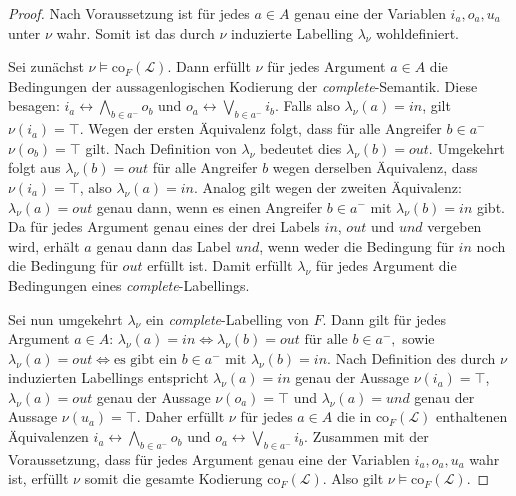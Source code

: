 \begin{proof}
    \label{pr:co-pl-correct}
    Nach Voraussetzung ist für jedes
    \(a\in A\) genau eine der Variablen \(i_a,o_a,u_a\) unter \(\nu\) wahr.
    Somit ist das durch \(\nu\) induzierte Labelling \(\lambda_\nu\)
    wohldefiniert.

    Sei zunächst \(\nu\models \mathrm{co}_F(\mathcal L)\). Dann erfüllt \(\nu\)
    für jedes Argument \(a\in A\) die Bedingungen der aussagenlogischen
    Kodierung der \textit{complete}-Semantik. Diese besagen:
    \(i_a \leftrightarrow \bigwedge_{b\in a^-} o_b\) und
    \(o_a \leftrightarrow \bigvee_{b\in a^-} i_b.\)
    Falls also \(\lambda_\nu(a)=\mathit{in}\), gilt \(\nu(i_a)=\top\).
    Wegen der ersten Äquivalenz folgt, dass für alle Angreifer
    \(b\in a^-\) \(\nu(o_b)=\top\) gilt. Nach Definition von
    \(\lambda_\nu\) bedeutet dies \(\lambda_\nu(b)=\mathit{out}\). Umgekehrt
    folgt aus \(\lambda_\nu(b)=\mathit{out}\) für alle Angreifer \(b\) wegen
    derselben Äquivalenz, dass \(\nu(i_a)=\top\), also
    \(\lambda_\nu(a)=\mathit{in}\).
    Analog gilt wegen der zweiten Äquivalenz:
    \(\lambda_\nu(a)=\mathit{out}\) genau dann, wenn es einen Angreifer
    \(b\in a^-\) mit \(\lambda_\nu(b)=\mathit{in}\) gibt.
    Da für jedes Argument genau eines der drei Labels \(\mathit{in}\),
    \(\mathit{out}\) und \(\mathit{und}\) vergeben wird, erhält \(a\) genau dann
    das Label \(\mathit{und}\), wenn weder die Bedingung für
    \(\mathit{in}\) noch die Bedingung für \(\mathit{out}\) erfüllt ist.
    Damit erfüllt \(\lambda_\nu\) für jedes Argument die Bedingungen eines
    \textit{complete}-Labellings.

    Sei nun umgekehrt \(\lambda_\nu\) ein
    \textit{complete}-Labelling von \(F\). Dann gilt für jedes Argument
    \(a\in A\): \(\lambda_\nu(a)=\mathit{in}
        \Longleftrightarrow
        \lambda_\nu(b)=\mathit{out}
        \text{ für alle } b\in a^-,\)
    sowie \(\lambda_\nu(a)=\mathit{out}
        \Longleftrightarrow
        \text{es gibt ein } b\in a^-
        \text{ mit } \lambda_\nu(b)=\mathit{in}.\)
    Nach Definition des durch \(\nu\) induzierten Labellings entspricht
    \(\lambda_\nu(a)=\mathit{in}\) genau der Aussage \(\nu(i_a)=\top\),
    \(\lambda_\nu(a)=\mathit{out}\) genau der Aussage \(\nu(o_a)=\top\) und
    \(\lambda_\nu(a)=\mathit{und}\) genau der Aussage \(\nu(u_a)=\top\).
    Daher erfüllt \(\nu\) für jedes \(a\in A\) die in
    \(\mathrm{co}_F(\mathcal L)\) enthaltenen Äquivalenzen
    \(i_a \leftrightarrow \bigwedge_{b\in a^-} o_b\)
    und
    \(o_a \leftrightarrow \bigvee_{b\in a^-} i_b.\)
    Zusammen mit der Voraussetzung, dass für jedes Argument genau eine der
    Variablen \(i_a,o_a,u_a\) wahr ist, erfüllt \(\nu\) somit die gesamte
    Kodierung \(\mathrm{co}_F(\mathcal L)\). Also gilt
    \(\nu\models \mathrm{co}_F(\mathcal L)\).
\end{proof}

